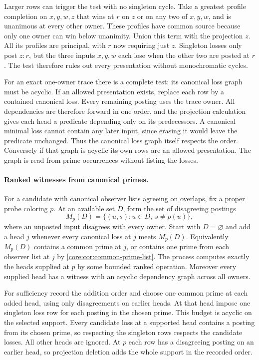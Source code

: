 Larger rows can trigger the test with no singleton
cycle. Take a greatest profile completion on $x,y,w,z$
that wins at $r$ on $z$ or on any two of $x,y,w$, and
is unanimous at every other owner. These profiles have
common source because only one owner can win below
unanimity. Union this term with the projection $z$.
All its profiles are principal, with $r$ now requiring
just $z$. Singleton losses only post $z:r$, but the
three inputs $x,y,w$ each lose when the other two are
posted at $r$. The test therefore rules out every
presentation without monochromatic cycles.

For an exact one-owner trace there is a complete
test: its canonical loss graph must be acyclic. If
an allowed presentation exists, replace each row
by a contained canonical loss. Every remaining
posting uses the trace owner. All dependencies are
therefore forward in one order, and the projection
calculation gives each head a predicate depending
only on its predecessors. A canonical minimal loss
cannot contain any later input, since erasing it
would leave the predicate unchanged. Thus the
canonical loss graph itself respects the order.
Conversely if that graph is acyclic its own rows
are an allowed presentation. The graph is read
from prime occurrences without listing the losses.

\paragraph{Ranked witnesses from canonical primes.}
For a candidate with canonical observer lists agreeing on overlaps,
fix a proper probe coloring $p$. At an available set $D$, form the
set of disagreeing postings
\[
 M_p(D)=\{(u,s):u\in D,\ s\ne p(u)\},
\]
where an unposted input disagrees with every owner. Start with
$D=\varnothing$ and add a head $j$ whenever every canonical loss
at $j$ meets $M_p(D)$. Equivalently $M_p(D)$ contains a common prime
at $j$, or contains one prime from each observer list at $j$
by \cref{core:cor:common-prime-list}. The process computes
exactly the heads supplied at $p$ by some bounded ranked operation.
Moreover every supplied head has a witness with an acyclic
dependency graph across all owners.

For sufficiency record the addition order and choose one common
prime at each added head, using only disagreements on earlier
heads. At that head impose one singleton loss row for each
posting in the chosen prime. This budget is acyclic on the
selected support. Every candidate loss at a supported head
contains a posting from its chosen prime, so respecting the
singleton rows respects the candidate losses. All other
heads are ignored. At $p$ each row has a disagreeing posting
on an earlier head, so projection deletion adds the whole
support in the recorded order.


